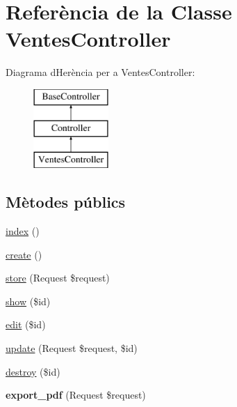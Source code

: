 \hypertarget{class_app_1_1_http_1_1_controllers_1_1_ventes_controller}{}\section{Referència de la Classe Ventes\+Controller}
\label{class_app_1_1_http_1_1_controllers_1_1_ventes_controller}
Diagrama d\textquotesingle{}Herència per a Ventes\+Controller\+:\begin{figure}[H]
\begin{center}
\leavevmode
\includegraphics[height=3.000000cm]{class_app_1_1_http_1_1_controllers_1_1_ventes_controller}
\end{center}
\end{figure}
\subsection*{Mètodes públics}
\begin{DoxyCompactItemize}
\item 
\mbox{\hyperlink{class_app_1_1_http_1_1_controllers_1_1_ventes_controller_a149eb92716c1084a935e04a8d95f7347}{index}} ()
\item 
\mbox{\hyperlink{class_app_1_1_http_1_1_controllers_1_1_ventes_controller_a435e7d7525d4bcd0ed5e34a469f3adf6}{create}} ()
\item 
\mbox{\hyperlink{class_app_1_1_http_1_1_controllers_1_1_ventes_controller_a9ef485163104597c12185b53cdacf638}{store}} (Request \$request)
\item 
\mbox{\hyperlink{class_app_1_1_http_1_1_controllers_1_1_ventes_controller_ae4914d07a9bbe4aede7a5dea759f6287}{show}} (\$id)
\item 
\mbox{\hyperlink{class_app_1_1_http_1_1_controllers_1_1_ventes_controller_a459ed16587e3a50b39b672c7e473abc5}{edit}} (\$id)
\item 
\mbox{\hyperlink{class_app_1_1_http_1_1_controllers_1_1_ventes_controller_affb03cc19897a1800a0f411264d6c7cc}{update}} (Request \$request, \$id)
\item 
\mbox{\hyperlink{class_app_1_1_http_1_1_controllers_1_1_ventes_controller_a726fa8a4b4b187b9ca32ba427aac8137}{destroy}} (\$id)
\item 
\mbox{\label{class_app_1_1_http_1_1_controllers_1_1_ventes_controller_a9b39eab2e7086f4561116b06ae9cbf4e}} 
{\bfseries export\+\_\+pdf} (Request \$request)
\end{DoxyCompactItemize}



